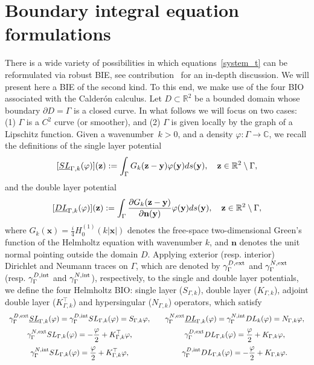 \documentclass[11pt]{article}
\numberwithin{equation}{section}
\begin{document}
\section{Boundary integral equation formulations\label{MS20}}

There is a wide variety of possibilities in which equations~\eqref{system_t} can be reformulated via robust BIE, see contribution~\cite{dominguez2016well} for an in-depth discussion. We will present here a BIE of the second kind. To this end, we make use of the four BIO associated with the Calder\'on calculus. Let $D\subset\mathbb{R}^2$ be a bounded domain whose boundary $\partial D=\Gamma$ is a closed curve. In what follows we will focus on two cases: (1) $\Gamma$ is a $C^2$ curve (or smoother), and (2) $\Gamma$ is given locally by the graph of a Lipschitz function. Given a wavenumber~$k>0$, and a density $\varphi:\Gamma\to\mathbb{C}$, we recall the definitions of the single layer potential~
$$[\emph{SL}_{\Gamma,k}(\varphi)](\mathbf{z}):=\int_\Gamma G_k(\mathbf{z}-\mathbf{y})\varphi(\mathbf{y})ds(\mathbf{y}),\quad \mathbf{z}\in\mathbb{R}^2\setminus\Gamma,$$
and the double layer potential 
$$[\emph{DL}_{\Gamma,k}(\varphi)](\mathbf{z}):=\int_\Gamma \frac{\partial G_k(\mathbf{z}-\mathbf{y})}{\partial\mathbf{n}(\mathbf{y})}\varphi(\mathbf{y})ds(\mathbf{y}),\quad \mathbf{z}\in\mathbb{R}^2\setminus\Gamma,$$
where $G_k(\mathbf{x})=\frac{i}{4}H_0^{(1)}(k|\mathbf{x}|)$ denotes the free-space two-dimensional Green's function of the Helmholtz equation with wavenumber $k$, and $\mathbf{n}$ denotes the unit normal pointing outside the domain $D$. Applying exterior (resp. interior) Dirichlet and Neumann traces on $\Gamma$, which are denoted by $\gamma_\Gamma^{D,\rm{ext}}$ and $\gamma_\Gamma^{N,\rm{ext}}$ (resp. $\gamma_\Gamma^{D,\rm{int}}$ and $\gamma_\Gamma^{N,\rm{int}}$), respectively, to the single and double layer potentials, we define the four Helmholtz BIO: single layer ($S_{\Gamma,k}$),  double layer ($K_{\Gamma,k}$), adjoint double layer ($K_{\Gamma,k}^\top$) and hypersingular  ($N_{\Gamma,k}$) operators, which satisfy
\begin{equation}\label{traces}\begin{array}{ccc}
\displaystyle\gamma_\Gamma^{D,\rm{ext}} \emph{SL}_{\Gamma,k}(\varphi)=\gamma_\Gamma^{D,\rm{int}} SL_{\Gamma,k}(\varphi)=S_{\Gamma,k}\varphi,&& \displaystyle\gamma_\Gamma^{N,\rm{ext}} \emph{DL}_{\Gamma,k}(\varphi)=\gamma_\Gamma^{N,\rm{int}} DL_k(\varphi)=N_{\Gamma,k}\varphi,\medskip\\
\displaystyle\gamma_\Gamma^{N,\rm{ext}} SL_{\Gamma,k}(\varphi)=-\frac{\varphi}{2}+K_{\Gamma,k}^\top \varphi,&&
\displaystyle\gamma_\Gamma^{D,\rm{ext}} DL_{\Gamma,k}(\varphi)=\frac{\varphi}{2}+K_{\Gamma,k}\varphi,\medskip\\
\displaystyle\gamma_\Gamma^{N,\rm{int}} SL_{\Gamma,k}(\varphi)=\frac{\varphi}{2}+K_{\Gamma,k}^\top \varphi,&&
\displaystyle\gamma_\Gamma^{D,\rm{int}} DL_{\Gamma,k}(\varphi)=-\frac{\varphi}{2}+K_{\Gamma,k}\varphi.
\end{array}\end{equation}
\end{document}
